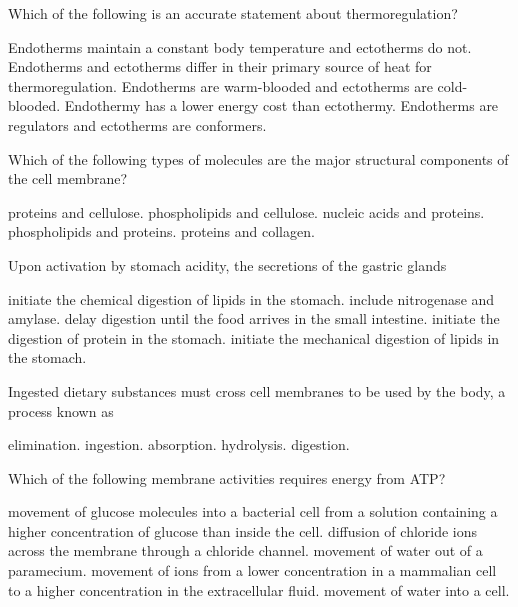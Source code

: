 \question
Which of the following is an accurate statement about thermoregulation?

\begin{choices}
\choice Endotherms maintain a constant body temperature and ectotherms do not. 
\correctchoice Endotherms and ectotherms differ in their primary source of heat for thermoregulation. 
\choice Endotherms are warm-blooded and ectotherms are cold-blooded.  
\choice Endothermy has a lower energy cost than ectothermy. 
\choice Endotherms are regulators and ectotherms are conformers. 
\end{choices}

\question
Which of the following types of molecules are the major structural components of the cell membrane?

\begin{choices}
\choice proteins and cellulose. 
\choice phospholipids and cellulose. 
\choice nucleic acids and proteins. 
\correctchoice phospholipids and proteins. 
\choice proteins and collagen. 
\end{choices}

\question
Upon activation by stomach acidity, the secretions of the gastric glands

\begin{choices}
\choice initiate the chemical digestion of lipids in the stomach.  
\choice include nitrogenase and amylase. 
\choice delay digestion until the food arrives in the small intestine. 
\correctchoice initiate the digestion of protein in the stomach. 
\choice initiate the mechanical digestion of lipids in the stomach. 
\end{choices}

\question
Ingested dietary substances must cross cell membranes to be used by the body, a process known as

\begin{choices}
\choice elimination. 
\choice ingestion. 
\correctchoice absorption. 
\choice hydrolysis. 
\choice digestion. 
\end{choices}

\newpage

\question
Which of the following membrane activities requires energy from ATP?

\begin{choices}
\choice movement of glucose molecules into a bacterial cell from a solution containing a higher concentration of glucose than inside the cell. 
\choice diffusion of chloride ions across the membrane through a chloride channel. 
\choice movement of water out of a paramecium. 
\correctchoice movement of  ions from a lower concentration in a mammalian cell to a higher concentration in the extracellular fluid. 
\choice movement of water into a cell. 
\end{choices}

